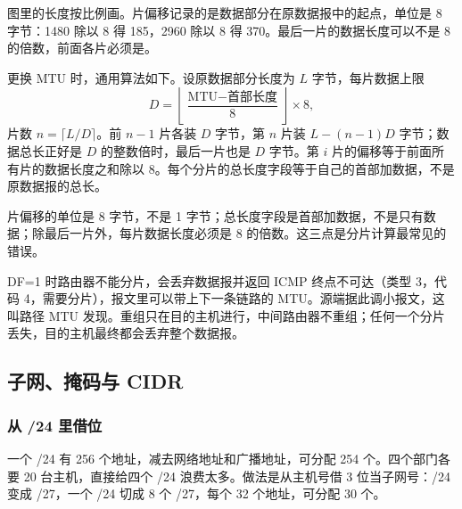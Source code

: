 图里的长度按比例画。片偏移记录的是数据部分在原数据报中的起点，单位是 8 字节：1480 除以 8 得 185，2960 除以 8 得 370。最后一片的数据长度可以不是 8 的倍数，前面各片必须是。

更换 MTU 时，通用算法如下。设原数据部分长度为 $L$ 字节，每片数据上限
\[
D=\left\lfloor\frac{\text{MTU}-\text{首部长度}}{8}\right\rfloor\times 8,
\]
片数 $n=\lceil L/D\rceil$。前 $n-1$ 片各装 $D$ 字节，第 $n$ 片装 $L-(n-1)D$ 字节；数据总长正好是 $D$ 的整数倍时，最后一片也是 $D$ 字节。第 $i$ 片的偏移等于前面所有片的数据长度之和除以 8。每个分片的总长度字段等于自己的首部加数据，不是原数据报的总长。

\begin{attention}
片偏移的单位是 8 字节，不是 1 字节；总长度字段是首部加数据，不是只有数据；除最后一片外，每片数据长度必须是 8 的倍数。这三点是分片计算最常见的错误。
\end{attention}

DF=1 时路由器不能分片，会丢弃数据报并返回 ICMP 终点不可达（类型 3，代码 4，需要分片），报文里可以带上下一条链路的 MTU。源端据此调小报文，这叫路径 MTU 发现。重组只在目的主机进行，中间路由器不重组；任何一个分片丢失，目的主机最终都会丢弃整个数据报。

\subsection{子网、掩码与 CIDR}

\subsubsection{从 /24 里借位}

一个 /24 有 256 个地址，减去网络地址和广播地址，可分配 254 个。四个部门各要 20 台主机，直接给四个 /24 浪费太多。做法是从主机号借 3 位当子网号：/24 变成 /27，一个 /24 切成 8 个 /27，每个 32 个地址，可分配 30 个。


